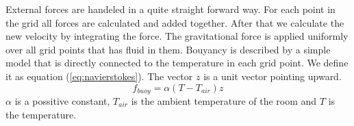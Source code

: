 External forces are handeled in a quite straight forward way. 
For each point in the grid all forces are calculated and added together. 
After that we calculate the new velocity by integrating the force.
The gravitational force is applied uniformly over all grid points that has fluid in them.
Bouyancy is described by a simple model that is directly connected to the temperature in each grid point.
We define it as equation (\ref{eq:navierstokes}).
The vector $z$ is a unit vector pointing upward. 
\begin{equation}
\label{eq:buoyancy}
f_{buoy} = \alpha(T-T_{air})z
\end{equation}
$\alpha$ is a possitive constant, $T_{air}$ is the ambient temperature of the room and $T$ is the temperature. 